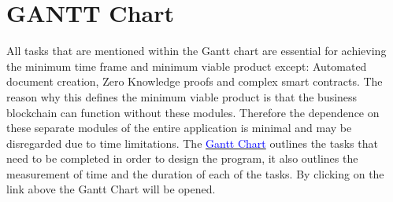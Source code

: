 \let\textcircled=\pgftextcircled
\chapter{GANTT Chart}

All tasks that are mentioned within the Gantt chart are essential for achieving the minimum time frame and minimum viable product except: Automated document creation, Zero Knowledge proofs and complex smart contracts. The reason why this defines the minimum viable product is that the business blockchain can function without these modules. Therefore the dependence on these separate modules of the entire application is minimal and may be disregarded due to time limitations. The \href{run:./gantt.xlsx}{\textcolor{blue}{Gantt Chart}} outlines the tasks that need to be completed in order to design the program, it also outlines the measurement of time and the duration of each of the tasks. By clicking on the link above the Gantt Chart will be opened.
